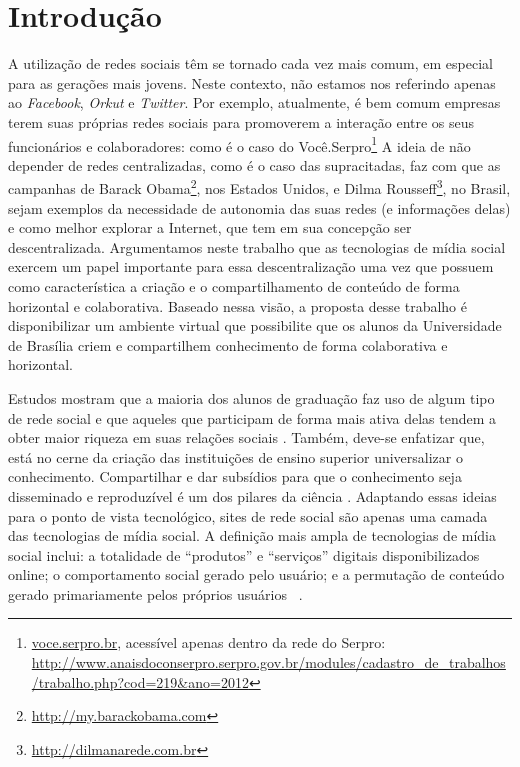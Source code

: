 \chapter{Introdução}
 
A utilização de redes sociais têm se tornado cada vez mais comum, em especial
para as gerações mais jovens. Neste contexto, não estamos nos
referindo apenas ao \textit{Facebook}, \textit{Orkut} e \textit{Twitter}. 
%
Por exemplo, atualmente, é bem comum empresas terem suas próprias redes sociais para
promoverem a interação entre os seus funcionários e colaboradores: como é o caso do
Você.Serpro\footnote{\url{voce.serpro.br}, acessível apenas dentro da rede do Serpro:
\url{http://www.anaisdoconserpro.serpro.gov.br/modules/cadastro_de_trabalhos/trabalho.php?cod=219&ano=2012}}
%
A ideia de não depender de redes centralizadas, como é o caso das supracitadas, faz com que
as campanhas de Barack Obama\footnote{\url{http://my.barackobama.com}}, nos
Estados Unidos, e Dilma Rousseff\footnote{\url{http://dilmanarede.com.br}}, no
Brasil, sejam exemplos da necessidade de autonomia das suas redes
(e informações delas) e como melhor explorar a Internet, que tem em sua
concepção ser descentralizada. 
%
Argumentamos neste trabalho que as tecnologias de mídia social exercem um papel importante para 
essa descentralização uma vez que possuem como característica a criação e o
compartilhamento de conteúdo de forma horizontal e colaborativa. 
%
Baseado nessa visão, a proposta desse trabalho é disponibilizar um ambiente
virtual que possibilite que os alunos da Universidade de Brasília criem e
compartilhem conhecimento de forma colaborativa e horizontal.
 
Estudos mostram que a maioria dos alunos de graduação faz uso de algum
tipo de rede social e que aqueles que participam de forma mais ativa delas
tendem a obter maior riqueza em suas relações sociais .
%
Também, deve-se enfatizar que, está no cerne da criação das instituições de
ensino superior universalizar o conhecimento. Compartilhar e dar subsídios para
que o conhecimento seja disseminado e reproduzível é um dos pilares da ciência
\cite{kon2011}.
%
Adaptando essas ideias para o ponto de vista tecnológico, sites de rede social
são apenas uma camada das tecnologias de mídia social. A definição mais ampla de
tecnologias de mídia social inclui: a totalidade de ``produtos'' e ``serviços''
digitais disponibilizados online; o comportamento social gerado pelo usuário; e
a permutação de conteúdo gerado primariamente pelos próprios usuários%
~\cite{davis2012}.
 
